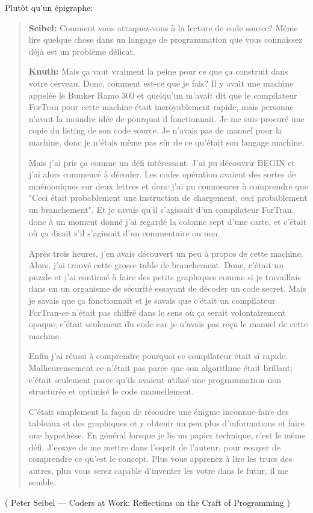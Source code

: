 Plutôt qu'un épigraphe:

\begin{framed}
\begin{quotation}

\textbf{Seibel:} Comment vous attaquez-vous à la lecture de code source? Même lire
quelque chose dans un langage de programmation que vous connaissez déjà est un problème
délicat.

\textbf{Knuth:} Mais ça vaut vraiment la peine pour ce que ça construit dans votre
cerveau. Donc, comment est-ce que je fais? Il y avait une machine appelée le Bunker
Ramo 300 et quelqu'un m'avait dit que le compilateur ForTran pour cette machine était
incroyablement rapide, mais personne n'avait la moindre idée de pourquoi il fonctionnait.
Je me suis procuré une copie du listing de son code source. Je n'avais pas de manuel
pour la machine, donc je n'étais même pas sûr de ce qu'était son langage machine.

Mais j'ai pris ça comme un défi intéressant. J'ai pu découvrir BEGIN et j'ai alors
commencé à décoder. Les codes opération avaient des sortes de mnémoniques sur deux
lettres et donc j'ai pu commencer à comprendre que "Ceci était probablement une
instruction de chargement, ceci probablement un branchement". Et je savais qu'il
s'agissait d'un compilateur ForTran, donc à un moment donné j'ai regardé la colonne
sept d'une carte, et c'était où ça disait s'il s'agissait d'un commentaire
ou non.

Après trois heures, j'en avais découvert un peu à propos de cette machine. Alors,
j'ai trouvé cette grosse table de branchement. Donc, c'était un puzzle et j'ai continué
à faire des petits graphiques comme si je travaillais dans un un organisme de sécurité
essayant de décoder un code secret. Mais je savais que ça fonctionnait et je savais
que c'était un compilateur ForTran-ce n'était pas chiffré dans le sens où ça serait
volontairement opaque; c'était seulement du code car je n'avais pas reçu le manuel
de cette machine.

Enfin j'ai réussi à comprendre pourquoi ce compilateur était si rapide.
Malheureusement ce n'était pas parce que son algorithme était brillant; c'était
seulement parce qu'ils avaient utilisé une programmation non structurée et optimisé
le code manuellement. 

C'était simplement la façon de résoudre une énigme inconnue-faire des tableaux et
des graphiques et y obtenir un peu plus d'informations et faire une hypothèse. En
général lorsque je lis un papier technique, c'est le même défi. J'essaye de me mettre
dans l'esprit de l'auteur, pour essayer de comprendre ce qu'est le concept. Plus
vous apprenez à lire les trucs des autres, plus vous serez capable d'inventer les
votre dans le futur, il me semble.

\end{quotation}
\end{framed}

( Peter Seibel --- Coders at Work: Reflections on the Craft of Programming )

